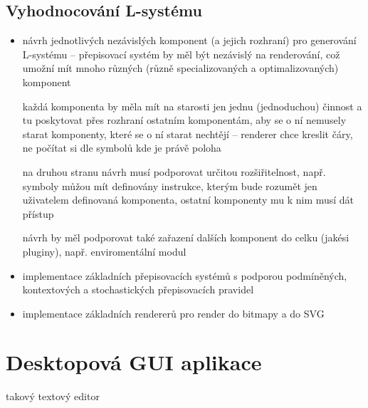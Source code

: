 \documentclass[12pt, a4paper]{article}
\begin{document}
\subsection{Vyhodnocování L-systému}
\begin{itemize}
	\item návrh jednotlivých nezávislých komponent (a jejich rozhraní) pro generování L-systému -- přepisovací systém by měl být nezávislý na renderování, což umožní mít mnoho různých (různě specializovaných a optimalizovaných) komponent

		každá komponenta by měla mít na starosti jen jednu (jednoduchou) činnost a tu poskytovat přes rozhraní ostatním komponentám, aby se o ní nemusely starat komponenty, které se o ní starat nechtějí -- renderer chce kreslit čáry, ne počítat si dle symbolů kde je právě poloha 

		na druhou stranu návrh musí podporovat určitou rozšiřitelnost, např. symboly můžou mít definovány instrukce, kterým bude rozumět jen uživatelem definovaná komponenta, ostatní komponenty mu k nim musí dát přístup

		návrh by měl podporovat také zařazení dalších komponent do celku (jakési pluginy), např. enviromentální modul
	\item implementace základních přepisovacích systémů s podporou podmíněných, kontextových a stochastických přepisovacích pravidel
	\item implementace základních rendererů pro render do bitmapy a do SVG
\end{itemize}


\section{Desktopová GUI aplikace}
takový  textový editor
\end{document}
